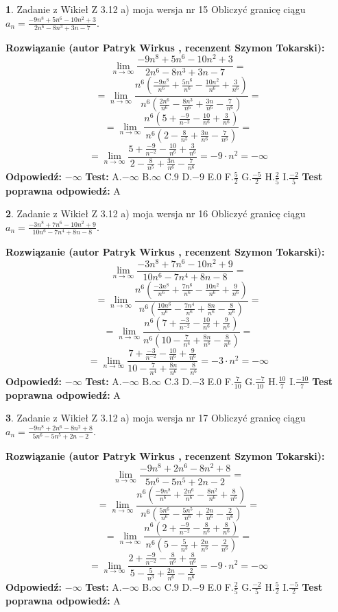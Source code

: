 \documentclass[12pt, a4paper]{article}
\theoremstyle{definition} %
\newtheorem{zad}{}
\newcommand{\zadStart}[1]{\begin{zad}#1\newline}
\newcommand{\zadStop}{\end{zad}}
\newcommand{\rozwStart}[2]{\noindent \textbf{Rozwiązanie (autor #1 , recenzent #2): }\newline}
\newcommand{\rozwStop}{\newline}
\newcommand{\odpStart}{\noindent \textbf{Odpowiedź:}\newline}
\newcommand{\odpStop}{\newline}
\newcommand{\testStart}{\noindent \textbf{Test:}\newline}
\newcommand{\testStop}{\newline}
\newcommand{\kluczStart}{\noindent \textbf{Test poprawna odpowiedź:}\newline}
\newcommand{\kluczStop}{\newline}
\begin{document}
\zadStart{Zadanie z Wikieł Z 3.12 a) moja wersja nr 15}
Obliczyć granicę ciągu $a_{n}=\frac{-9n^{8}+5n^{6}-10n^{2}+3}{2n^{6}-8n^{3}+3n-7}$.
\zadStop
\rozwStart{Patryk Wirkus}{Szymon Tokarski}
$$\lim\limits_{n\to\infty}\frac{-9n^{8}+5n^{6}-10n^{2}+3}{2n^{6}-8n^{3}+3n-7}=$$
$$=\lim\limits_{n\to\infty}\frac{n^{6}\left(\frac{-9n^{8}}{n^{6}}+\frac{5n^{6}}{n^{6}}-\frac{10n^{2}}{n^{6}}+\frac{3}{n^{6}}\right)}{n^{6}\left(\frac{2n^{6}}{n^{6}}-\frac{8n^{3}}{n^{6}}+\frac{3n}{n^{6}}-\frac{7}{n^{6}}\right)}=$$
$$=\lim\limits_{n\to\infty}\frac{n^{6}\left(5+\frac{-9}{n^{-2}}-\frac{10}{n^{6}}+\frac{3}{n^{6}}\right)}
{n^{6}\left(2-\frac{8}{n^{5}}+\frac{3n}{n^{6}}-\frac{7}{n^{6}}\right)}=$$
$$=\lim\limits_{n\to\infty}\frac{5+\frac{-9}{n^{-2}}-\frac{10}{n^{6}}+\frac{3}{n^{6}}}{2-\frac{8}{n^{5}}+\frac{3n}{n^{6}}-\frac{7}{n^{6}}}=-9\cdot n^{2} = -\infty$$
\rozwStop
\odpStart
$-\infty$
\odpStop
\testStart
A.$-\infty$
B.$\infty$
C.$9$
D.$-9$
E.$0$
F.$\frac{5}{2}$
G.$\frac{-5}{2}$
H.$\frac{2}{5}$
I.$\frac{-2}{5}$
\testStop
\kluczStart
A
\kluczStop



\zadStart{Zadanie z Wikieł Z 3.12 a) moja wersja nr 16}
Obliczyć granicę ciągu $a_{n}=\frac{-3n^{8}+7n^{6}-10n^{2}+9}{10n^{6}-7n^{4}+8n-8}$.
\zadStop
\rozwStart{Patryk Wirkus}{Szymon Tokarski}
$$\lim\limits_{n\to\infty}\frac{-3n^{8}+7n^{6}-10n^{2}+9}{10n^{6}-7n^{4}+8n-8}=$$
$$=\lim\limits_{n\to\infty}\frac{n^{6}\left(\frac{-3n^{8}}{n^{6}}+\frac{7n^{6}}{n^{6}}-\frac{10n^{2}}{n^{6}}+\frac{9}{n^{6}}\right)}{n^{6}\left(\frac{10n^{6}}{n^{6}}-\frac{7n^{4}}{n^{6}}+\frac{8n}{n^{6}}-\frac{8}{n^{6}}\right)}=$$
$$=\lim\limits_{n\to\infty}\frac{n^{6}\left(7+\frac{-3}{n^{-2}}-\frac{10}{n^{6}}+\frac{9}{n^{6}}\right)}
{n^{6}\left(10-\frac{7}{n^{4}}+\frac{8n}{n^{6}}-\frac{8}{n^{6}}\right)}=$$
$$=\lim\limits_{n\to\infty}\frac{7+\frac{-3}{n^{-2}}-\frac{10}{n^{6}}+\frac{9}{n^{6}}}{10-\frac{7}{n^{4}}+\frac{8n}{n^{6}}-\frac{8}{n^{6}}}=-3\cdot n^{2} = -\infty$$
\rozwStop
\odpStart
$-\infty$
\odpStop
\testStart
A.$-\infty$
B.$\infty$
C.$3$
D.$-3$
E.$0$
F.$\frac{7}{10}$
G.$\frac{-7}{10}$
H.$\frac{10}{7}$
I.$\frac{-10}{7}$
\testStop
\kluczStart
A
\kluczStop



\zadStart{Zadanie z Wikieł Z 3.12 a) moja wersja nr 17}
Obliczyć granicę ciągu $a_{n}=\frac{-9n^{8}+2n^{6}-8n^{2}+8}{5n^{6}-5n^{5}+2n-2}$.
\zadStop
\rozwStart{Patryk Wirkus}{Szymon Tokarski}
$$\lim\limits_{n\to\infty}\frac{-9n^{8}+2n^{6}-8n^{2}+8}{5n^{6}-5n^{5}+2n-2}=$$
$$=\lim\limits_{n\to\infty}\frac{n^{6}\left(\frac{-9n^{8}}{n^{6}}+\frac{2n^{6}}{n^{6}}-\frac{8n^{2}}{n^{6}}+\frac{8}{n^{6}}\right)}{n^{6}\left(\frac{5n^{6}}{n^{6}}-\frac{5n^{5}}{n^{6}}+\frac{2n}{n^{6}}-\frac{2}{n^{6}}\right)}=$$
$$=\lim\limits_{n\to\infty}\frac{n^{6}\left(2+\frac{-9}{n^{-2}}-\frac{8}{n^{6}}+\frac{8}{n^{6}}\right)}
{n^{6}\left(5-\frac{5}{n^{3}}+\frac{2n}{n^{6}}-\frac{2}{n^{6}}\right)}=$$
$$=\lim\limits_{n\to\infty}\frac{2+\frac{-9}{n^{-2}}-\frac{8}{n^{6}}+\frac{8}{n^{6}}}{5-\frac{5}{n^{3}}+\frac{2n}{n^{6}}-\frac{2}{n^{6}}}=-9\cdot n^{2} = -\infty$$
\rozwStop
\odpStart
$-\infty$
\odpStop
\testStart
A.$-\infty$
B.$\infty$
C.$9$
D.$-9$
E.$0$
F.$\frac{2}{5}$
G.$\frac{-2}{5}$
H.$\frac{5}{2}$
I.$\frac{-5}{2}$
\testStop
\kluczStart
A
\kluczStop
\end{document}
